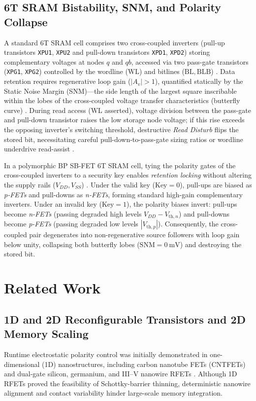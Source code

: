 \documentclass[conference]{IEEEtran}
\begin{document}
\subsection{6T SRAM Bistability, SNM, and Polarity Collapse}
A standard 6T SRAM cell comprises two cross-coupled inverters (pull-up transistors \texttt{XPU1}, \texttt{XPU2} and pull-down transistors \texttt{XPD1}, \texttt{XPD2}) storing complementary voltages at nodes $q$ and $qb$, accessed via two pass-gate transistors (\texttt{XPG1}, \texttt{XPG2}) controlled by the wordline ($\mathrm{WL}$) and bitlines ($\mathrm{BL}, \mathrm{BLB}$) \cite{rabaey2003}. Data retention requires regenerative loop gain ($|A_v| > 1$), quantified statically by the Static Noise Margin (SNM)---the side length of the largest square inscribable within the lobes of the cross-coupled voltage transfer characteristics (butterfly curve) \cite{seevinck1987static, rabaey2003}. During read access ($\mathrm{WL}$ asserted), voltage division between the pass-gate and pull-down transistor raises the low storage node voltage; if this rise exceeds the opposing inverter's switching threshold, destructive \textit{Read Disturb} flips the stored bit, necessitating careful pull-down-to-pass-gate sizing ratios or wordline underdrive read-assist \cite{rabaey2003, mann2010limits}.

In a polymorphic BP SB-FET 6T SRAM cell, tying the polarity gates of the cross-coupled inverters to a security key enables \emph{retention locking} without altering the supply rails ($V_{DD}, V_{SS}$) \cite{wu2021}. Under the valid key ($\text{Key}=0$), pull-ups are biased as \textit{p-FETs} and pull-downs as \textit{n-FETs}, forming standard high-gain complementary inverters. Under an invalid key ($\text{Key}=1$), the polarity biases invert: pull-ups become \textit{n-FETs} (passing degraded high levels $V_{DD} - V_{\mathrm{th},n}$) and pull-downs become \textit{p-FETs} (passing degraded low levels $|V_{\mathrm{th},p}|$). Consequently, the cross-coupled pair degenerates into non-regenerative source followers with loop gain below unity, collapsing both butterfly lobes ($\mathrm{SNM} = 0\ \text{mV}$) and destroying the stored bit.

\section{Related Work}
\subsection{1D and 2D Reconfigurable Transistors and 2D Memory Scaling}
Runtime electrostatic polarity control was initially demonstrated in one-dimensional (1D) nanostructures, including carbon nanotube FETs (CNTFETs) \cite{martel2001, martel2002, freitag2004} and dual-gate silicon, germanium, and III--V nanowire RFETs \cite{heinzig2012, mikolajick2017, mikolajick2021, demarchi2014, zhang2014, fuchsberger2023, fuchsberger2024a, fuchsberger2024b, rhee2025}. Although 1D RFETs proved the feasibility of Schottky-barrier thinning, deterministic nanowire alignment and contact variability hinder large-scale memory integration.
\end{document}

